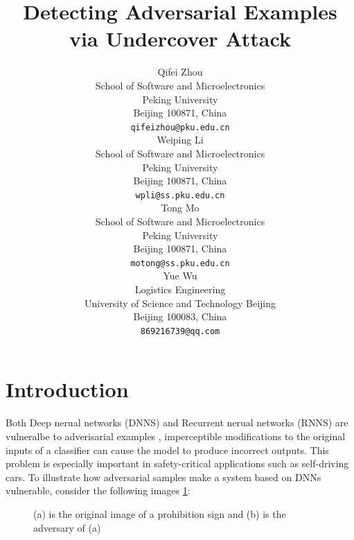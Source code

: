 \documentclass{article}
\title{Detecting Adversarial Examples via Undercover Attack}
\author{%
  Qifei Zhou \\ %
  School of Software and Microelectronics\\
  Peking University\\
  Beijing 100871, China \\
  \texttt{qifeizhou@pku.edu.cn} \\
  \And
  Weiping Li \\
  School of Software and Microelectronics\\
  Peking University\\
  Beijing 100871, China \\
  \texttt{wpli@ss.pku.edu.cn} \\
  \AND
  Tong Mo \\
  School of Software and Microelectronics\\
  Peking University\\
  Beijing 100871, China \\
  \texttt{motong@ss.pku.edu.cn} \\
  \And
  Yue Wu \\
  Logistics Engineering \\
  University of Science and Technology Beijing \\
  Beijing 100083, China \\
  \texttt{869216739@qq.com} \\
}
\begin{document}

\maketitle

\begin{abstract}

\end{abstract}

\section{Introduction}
 
Both Deep nerual networks (DNNS) and Recurrent nerual networks (RNNS) are vulneralbe to adverisarial examples \cite{Szegedy2013Intriguing,Goodfellow2014Explaining,Papernot2016Transferability,papernot2016crafting}, imperceptible modifications to the original inputs of a classifier can cause the model to produce incorrect outputs. This problem is especially important in safety-critical applications such as self-driving cars. To illustrate how adversarial samples make a system based on DNNs vulnerable, consider the following 
images \ref{car}:

\begin{figure}[h]
  \centerline{
  }
  \caption{(a) is the original image of a prohibition sign and (b) is the adversary of (a)}
  \label{car}
\end{figure}
\end{document}
